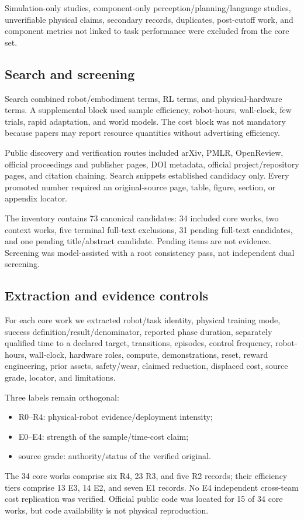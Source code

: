 \documentclass[11pt]{article}
\begin{document}
Simulation-only studies, component-only perception/planning/language studies, unverifiable physical claims, secondary records, duplicates, post-cutoff work, and component metrics not linked to task performance were excluded from the core set.

\subsection{Search and screening}

Search combined robot/embodiment terms, RL terms, and physical-hardware terms. A supplemental block used sample efficiency, robot-hours, wall-clock, few trials, rapid adaptation, and world models. The cost block was not mandatory because papers may report resource quantities without advertising efficiency.

Public discovery and verification routes included arXiv, PMLR, OpenReview, official proceedings and publisher pages, DOI metadata, official project/repository pages, and citation chaining. Search snippets established candidacy only. Every promoted number required an original-source page, table, figure, section, or appendix locator.

The inventory contains 73 canonical candidates: 34 included core works, two context works, five terminal full-text exclusions, 31 pending full-text candidates, and one pending title/abstract candidate. Pending items are not evidence. Screening was model-assisted with a root consistency pass, not independent dual screening.

\subsection{Extraction and evidence controls}

For each core work we extracted robot/task identity, physical training mode, success definition/result/denominator, reported phase duration, separately qualified time to a declared target, transitions, episodes, control frequency, robot-hours, wall-clock, hardware roles, compute, demonstrations, reset, reward engineering, prior assets, safety/wear, claimed reduction, displaced cost, source grade, locator, and limitations.

Three labels remain orthogonal:
\begin{itemize}
    \item R0--R4: physical-robot evidence/deployment intensity;
    \item E0--E4: strength of the sample/time-cost claim;
    \item source grade: authority/status of the verified original.
\end{itemize}
The 34 core works comprise six R4, 23 R3, and five R2 records; their efficiency tiers comprise 13 E3, 14 E2, and seven E1 records. No E4 independent cross-team cost replication was verified. Official public code was located for 15 of 34 core works, but code availability is not physical reproduction.
\end{document}

